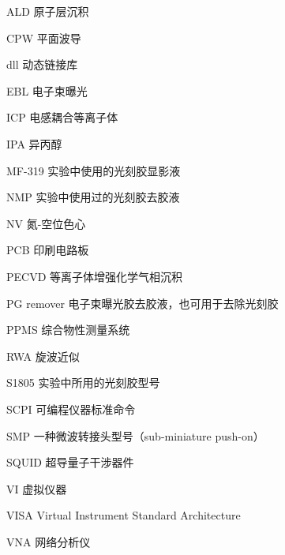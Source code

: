 

\begin{denotation}[3cm]
\item[ALD] 原子层沉积
\item[CPW] 平面波导
\item[dll] 动态链接库
\item[EBL] 电子束曝光
\item[ICP] 电感耦合等离子体
\item[IPA] 异丙醇
\item[MF-319] 实验中使用的光刻胶显影液
\item[NMP] 实验中使用过的光刻胶去胶液
\item[NV] 氮-空位色心
\item[PCB] 印刷电路板
\item[PECVD] 等离子体增强化学气相沉积
\item[PG remover] 电子束曝光胶去胶液，也可用于去除光刻胶
\item[PPMS] 综合物性测量系统
\item[RWA] 旋波近似
\item[S1805] 实验中所用的光刻胶型号
\item[SCPI] 可编程仪器标准命令
\item[SMP] 一种微波转接头型号（sub-miniature push-on）
\item[SQUID] 超导量子干涉器件
\item[VI] 虚拟仪器
\item[VISA] Virtual Instrument Standard Architecture
\item[VNA] 网络分析仪
\end{denotation}
